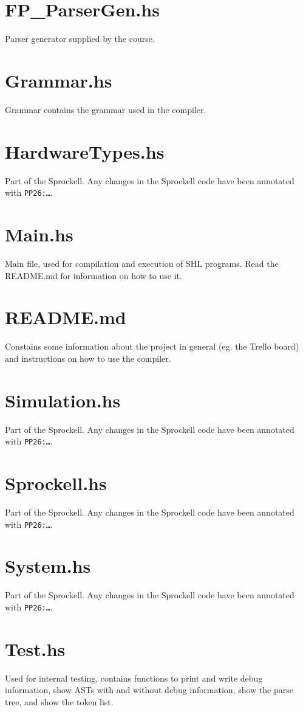 \documentclass[twoside]{report}
\begin{document}
\section{FP\_{}ParserGen.hs}
Parser generator supplied by the course.

\section{Grammar.hs}
Grammar contains the grammar used in the compiler.

\section{HardwareTypes.hs}
Part of the Sprockell. Any changes in the Sprockell code have been annotated with \texttt{PP26:\ldots}.

\section{Main.hs}
Main file, used for compilation and execution of SHL programs. Read the README.md for information on how to use it.

\section{README.md}
Constains some information about the project in general (eg. the Trello board) and instructions on how to use the compiler.

\section{Simulation.hs}
Part of the Sprockell. Any changes in the Sprockell code have been annotated with \texttt{PP26:\ldots}.

\section{Sprockell.hs}
Part of the Sprockell. Any changes in the Sprockell code have been annotated with \texttt{PP26:\ldots}.

\section{System.hs}
Part of the Sprockell. Any changes in the Sprockell code have been annotated with \texttt{PP26:\ldots}.

\section{Test.hs}
Used for internal testing, contains functions to print and write debug information, show ASTs with and without debug information, show the parse tree, and show the token list.
\end{document}
